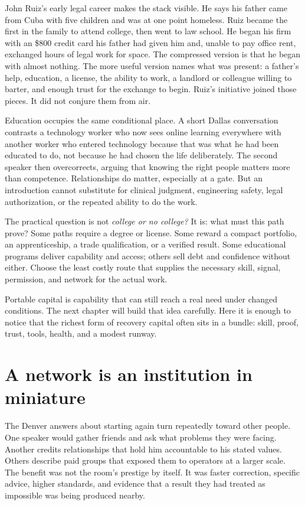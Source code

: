 John Ruiz's early legal career makes the stack visible. He says his father came
from Cuba with five children and was at one point homeless. Ruiz became the
first in the family to attend college, then went to law school. He began his
firm with an \$800 credit card his father had given him and, unable to pay office
rent, exchanged hours of legal work for space. The compressed version is that
he began with almost nothing. The more useful version names what was present:
a father's help, education, a license, the ability to work, a landlord or
colleague willing to barter, and enough trust for the exchange to begin. Ruiz's
initiative joined those pieces. It did not conjure them from air.

Education occupies the same conditional place. A short Dallas conversation
contrasts a technology worker who now sees online learning everywhere with
another worker who entered technology because that was what he had been
educated to do, not because he had chosen the life deliberately. The second
speaker then overcorrects, arguing that knowing the right people matters more
than competence. Relationships do matter, especially at a gate. But an
introduction cannot substitute for clinical judgment, engineering safety,
legal authorization, or the repeated ability to do the work.

The practical question is not \emph{college or no college?} It is: what must
this path prove? Some paths require a degree or license. Some reward a compact
portfolio, an apprenticeship, a trade qualification, or a verified result.
Some educational programs deliver capability and access; others sell debt and
confidence without either. Choose the least costly route that supplies the
necessary skill, signal, permission, and network for the actual work.

Portable capital is capability that can still reach a real need under changed
conditions. The next chapter will
build that idea carefully. Here it is enough to notice that the richest form
of recovery capital often sits in a bundle: skill, proof, trust, tools, health,
and a modest runway.

\section{A network is an institution in miniature}

The Denver answers about starting again turn repeatedly toward other people.
One speaker would gather friends and ask what problems they were facing.
Another credits relationships that hold him accountable to his stated values.
Others describe paid groups that exposed them to operators at a larger scale.
The benefit was not the room's prestige by itself. It was faster correction,
specific advice, higher standards, and evidence that a result they had treated
as impossible was being produced nearby.

